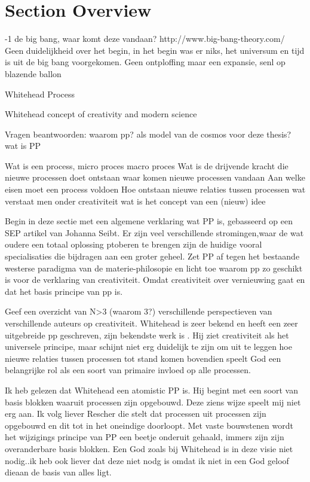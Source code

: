 \documentclass[a4paper]{Thesis}
\begin{document}
\section{Section Overview}

-1 de big bang, waar komt deze vandaan?
http://www.big-bang-theory.com/
Geen duidelijkheid over het begin, in het begin was er niks, het universum en tijd is uit de big bang voorgekomen.
Geen ontploffing maar een expansie, senl op blazende ballon

Whitehead
Process

Whitehead concept of creativity and modern science




Vragen beantwoorden:
waarom pp? als model van de cosmos voor deze thesis?
wat is PP

Wat is een process, micro proces macro proces
Wat is de drijvende kracht die nieuwe processen doet ontstaan
waar komen nieuwe processen vandaan
Aan welke eisen moet een process voldoen
Hoe ontstaan nieuwe relaties tussen processen
wat verstaat men onder creativiteit
wat is het concept van een (nieuw) idee

Begin in deze sectie met een algemene verklaring wat PP is, gebasseerd op een SEP artikel van Johanna Seibt. Er zijn veel verschillende stromingen,waar de wat oudere een totaal oplossing ptoberen te brengen zijn de huidige vooral specialisaties die bijdragen aan een groter geheel.
Zet PP af tegen het bestaande westerse paradigma van de materie-philosopie en licht toe waarom pp zo geschikt is voor de verklaring van creativiteit. Omdat creativiteit over vernieuwing gaat en dat het basis principe van pp is.

Geef een overzicht van N>3 (waarom 3?) verschillende perspectieven van verschillende auteurs op creativiteit. Whitehead is zeer bekend en heeft een zeer uitgebreide pp geschreven, zijn bekendste werk is \cite{whitehead1929process}. Hij ziet creativiteit als het universele principe, maar schijnt niet erg duidelijk te zijn om uit te leggen hoe nieuwe relaties tussen processen tot stand komen bovendien speelt God een belangrijke rol als een soort van primaire invloed op alle processen.

Ik heb gelezen dat Whitehead een atomistic PP is. Hij begint met een soort van basis blokken waaruit processen zijn opgebouwd. Deze ziens wijze speelt mij niet erg aan. Ik volg liever Rescher die stelt dat processen uit processen zijn opgebouwd en dit tot in het oneindige doorloopt. Met vaste bouwstenen wordt het wijzigings principe van PP een beetje onderuit gehaald, immers zijn zijn overanderbare basis blokken. Een God zoals bij Whitehead is in deze visie niet nodig..ik heb ook liever dat deze niet nodg is omdat ik niet in een God geloof dieaan de basis van alles ligt.
\end{document}
